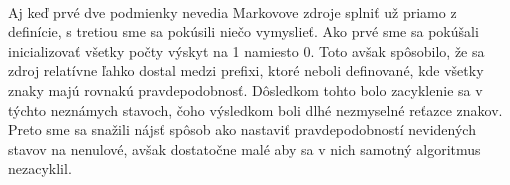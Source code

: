 \paragraph{}
Aj keď prvé dve podmienky nevedia Markovove zdroje splniť už priamo z definície, s tretiou sme sa pokúsili niečo vymyslieť. Ako prvé sme sa pokúšali inicializovať všetky počty výskyt na 1 namiesto 0. Toto avšak spôsobilo, že sa zdroj relatívne ľahko dostal medzi prefixi, ktoré neboli definované, kde všetky znaky majú rovnakú pravdepodobnosť. Dôsledkom tohto bolo zacyklenie sa v týchto neznámych stavoch, čoho výsledkom boli dlhé nezmyselné reťazce znakov. Preto sme sa snažili nájsť spôsob ako nastaviť pravdepodobností nevidených stavov na nenulové, avšak dostatočne malé aby sa v nich samotný algoritmus nezacyklil.